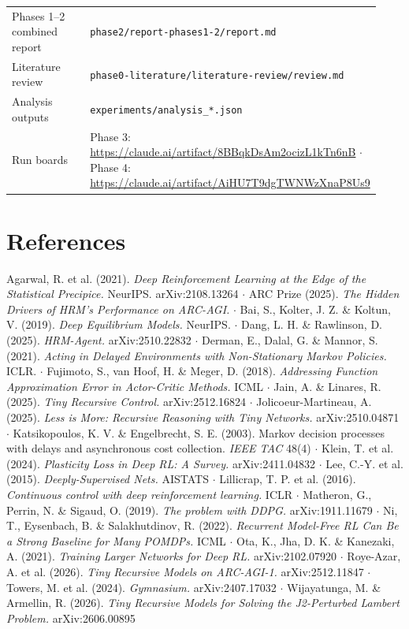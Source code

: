 \documentclass[11pt]{article}
\begin{document}
\begin{center}
\begin{tabular}{>{\raggedright\arraybackslash}p{0.277\linewidth}>{\raggedright\arraybackslash}p{0.657\linewidth}}
Phases 1--2 combined report & \texttt{phase2/\allowbreak{}report-phases1-2/\allowbreak{}report.\allowbreak{}md} \\
Literature review & \texttt{phase0-literature/\allowbreak{}literature-review/\allowbreak{}review.\allowbreak{}md} \\
Analysis outputs & \texttt{experiments/\allowbreak{}analysis\_\allowbreak{}*.\allowbreak{}json} \\
Run boards & Phase 3: \url{https://claude.ai/artifact/8BBqkDsAm2ocizL1kTn6nB} $\cdot$ Phase 4: \url{https://claude.ai/artifact/AiHU7T9dgTWNWzXnaP8Us9} \\
\bottomrule
\end{tabular}\end{center}



\section*{References}



Agarwal, R. et al. (2021). \emph{Deep Reinforcement Learning at the Edge of the Statistical Precipice.} NeurIPS. arXiv:2108.13264 $\cdot$ ARC Prize (2025). \emph{The Hidden Drivers of HRM's Performance on ARC-AGI.} $\cdot$ Bai, S., Kolter, J. Z. \& Koltun, V. (2019). \emph{Deep Equilibrium Models.} NeurIPS. $\cdot$ Dang, L. H. \& Rawlinson, D. (2025). \emph{HRM-Agent.} arXiv:2510.22832 $\cdot$ Derman, E., Dalal, G. \& Mannor, S. (2021). \emph{Acting in Delayed Environments with Non-Stationary Markov Policies.} ICLR. $\cdot$ Fujimoto, S., van Hoof, H. \& Meger, D. (2018). \emph{Addressing Function Approximation Error in Actor-Critic Methods.} ICML $\cdot$ Jain, A. \& Linares, R. (2025). \emph{Tiny Recursive Control.} arXiv:2512.16824 $\cdot$ Jolicoeur-Martineau, A. (2025). \emph{Less is More: Recursive Reasoning with Tiny Networks.} arXiv:2510.04871 $\cdot$ Katsikopoulos, K. V. \& Engelbrecht, S. E. (2003). Markov decision processes with delays and asynchronous cost collection. \emph{IEEE TAC} 48(4) $\cdot$ Klein, T. et al. (2024). \emph{Plasticity Loss in Deep RL: A Survey.} arXiv:2411.04832 $\cdot$ Lee, C.-Y. et al. (2015). \emph{Deeply-Supervised Nets.} AISTATS $\cdot$ Lillicrap, T. P. et al. (2016). \emph{Continuous control with deep reinforcement learning.} ICLR $\cdot$ Matheron, G., Perrin, N. \& Sigaud, O. (2019). \emph{The problem with DDPG.} arXiv:1911.11679 $\cdot$ Ni, T., Eysenbach, B. \& Salakhutdinov, R. (2022). \emph{Recurrent Model-Free RL Can Be a Strong Baseline for Many POMDPs.} ICML $\cdot$ Ota, K., Jha, D. K. \& Kanezaki, A. (2021). \emph{Training Larger Networks for Deep RL.} arXiv:2102.07920 $\cdot$ Roye-Azar, A. et al. (2026). \emph{Tiny Recursive Models on ARC-AGI-1.} arXiv:2512.11847 $\cdot$ Towers, M. et al. (2024). \emph{Gymnasium.} arXiv:2407.17032 $\cdot$ Wijayatunga, M. \& Armellin, R. (2026). \emph{Tiny Recursive Models for Solving the J2-Perturbed Lambert Problem.} arXiv:2606.00895
\end{document}
